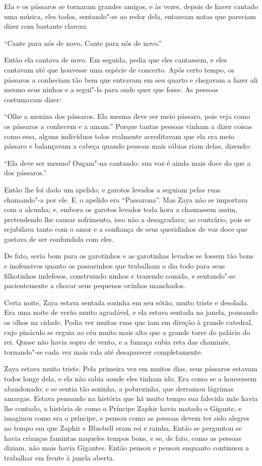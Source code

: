 Ela e os pássaros se tornaram grandes amigos, e às vezes, depois de
haver cantado uma música, eles todos, sentando"-se ao redor dela, entoavam
notas que pareciam dizer com bastante clareza:

``Cante para nós de novo. Cante para nós de novo.''

Então ela cantava de novo. Em seguida, pedia que eles cantassem, e eles
cantavam até que houvesse uma espécie de concerto. Após certo tempo, os
pássaros a conheciam tão bem que entravam em seu quarto e chegavam a
fazer ali mesmo seus ninhos e a segui"-la para onde quer que fosse. As
pessoas costumavam dizer:

``Olhe a menina dos pássaros. Ela mesma deve ser meio pássaro, pois
veja como os pássaros a conhecem e a amam.'' Porque tantas pessoas vinham a
dizer coisas como essa, alguns indivíduos tolos realmente acreditavam
que ela era meio pássaro e balançavam a cabeça quando pessoas mais
sábias riam delas, dizendo:

``Ela deve ser mesmo! Ouçam"-na cantando: sua voz é ainda mais doce do
que a dos pássaros.''

Então lhe foi dado um apelido; e garotos levados a seguiam pelas ruas
chamando"-a por ele. E~o apelido era ``Passarona''. Mas Zaya não se
importava com a alcunha; e, embora os garotos levados toda hora a
chamassem assim, pretendendo lhe causar sofrimento, isso não a
desagradava; ao contrário, pois se rejubilava tanto com o amor e a
confiança de seus queridinhos de voz doce que gostava de ser confundida
com eles.

De fato, seria bom para os garotinhos e as garotinhas levados se fossem
tão bons e inofensivos quanto os passarinhos que trabalham o dia todo
para seus filhotinhos indefesos, construindo ninhos e trazendo comida, e
sentando"-se pacientemente a chocar seus pequenos ovinhos manchados.


Certa noite, Zaya estava sentada sozinha em seu sótão, muito triste e
desolada. Era uma noite de verão muito agradável, e ela estava sentada
na janela, pousando os olhos na cidade. Podia ver muitas ruas que
iam em direção à grande catedral, cujo pináculo se erguia ao céu muito
mais alto que a grande torre do palácio do rei. Quase não havia sopro de
vento, e a fumaça subia reta das chaminés, tornando"-se cada vez mais
rala até desaparecer completamente.


Zaya estava muito triste. Pela primeira vez em muitos dias, seus
pássaros estavam todos longe dela, e ela não sabia aonde eles tinham ido.
Era como se a houvessem abandonado; e se sentia tão sozinha,
a pobrezinha, que derramou lágrimas amargas. Estava pensando na história
que há muito tempo sua falecida mãe havia lhe contado, a história de
como o Príncipe Zaphir havia matado o Gigante, e imaginou como era o
príncipe, e pensou como as pessoas devem ter sido alegres no tempo em que Zaphir
e Bluebell eram rei e rainha. Então se perguntou se havia crianças
famintas naqueles tempos bons, e se, de fato, como as pessoas diziam,
não mais havia Gigantes. Então pensou e pensou enquanto continuou a
trabalhar em frente à janela aberta.

